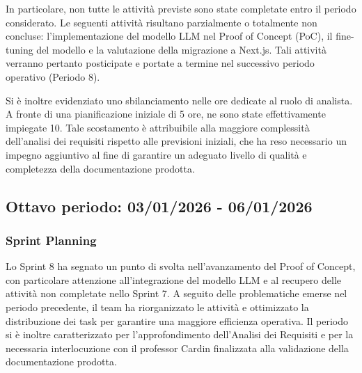 \documentclass[a4paper, 11pt, oneside]{scrartcl} %
\begin{document}
In particolare, non tutte le attività previste sono state completate entro il periodo considerato. Le seguenti attività risultano parzialmente o totalmente non concluse: 
l’implementazione del modello LLM nel Proof of Concept (PoC), il fine-tuning del modello e la valutazione della migrazione a Next.js. Tali attività verranno pertanto posticipate e portate a termine nel successivo periodo operativo (Periodo 8).

Si è inoltre evidenziato uno sbilanciamento nelle ore dedicate al ruolo di analista. A fronte di una pianificazione iniziale di 5 ore, ne sono state effettivamente impiegate 10. 
Tale scostamento è attribuibile alla maggiore complessità dell’analisi dei requisiti rispetto alle previsioni iniziali, che ha reso necessario un impegno aggiuntivo al fine di garantire un adeguato livello di qualità e completezza della documentazione prodotta.
\newpage



\subsection{Ottavo periodo: 03/01/2026 - 06/01/2026}

\subsubsection*{Sprint Planning}

Lo Sprint 8 ha segnato un punto di svolta nell'avanzamento del Proof of Concept, con particolare attenzione all'integrazione del modello LLM e al recupero delle attività non completate nello Sprint 7. A seguito delle problematiche emerse nel periodo precedente, il team ha riorganizzato le attività e ottimizzato la distribuzione dei task per garantire una maggiore efficienza operativa. Il periodo si è inoltre caratterizzato per l'approfondimento dell'Analisi dei Requisiti e per la necessaria interlocuzione con il professor Cardin finalizzata alla validazione della documentazione prodotta.
\end{document}
